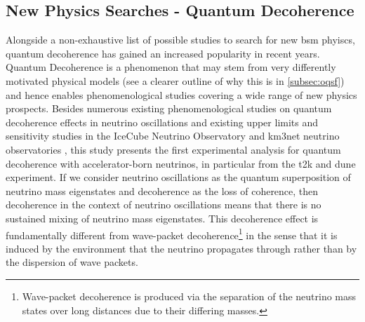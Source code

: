 \subsection{New Physics Searches - Quantum Decoherence}\label{subsec:decoh}
Alongside a non-exhaustive list of possible studies to search for new \acrfull{bsm} phyiscs, quantum decoherence has gained an increased popularity in recent years. Quantum Decoherence is a phenomenon that may stem from very differently motivated physical models (see a clearer outline of why this is in \cref{subsec:oqsf}) and hence enables phenomenological studies covering a wide range of new physics prospects. Besides numerous existing phenomenological studies on quantum decoherence effects in neutrino oscillations \cite{DeRomeri:2023dht,Barenboim:2024wdn,Gomes:2020muc} and existing upper limits and sensitivity studies in the IceCube Neutrino Observatory \cite{IceCube:2021tdn,ICECUBE:2023gdv} and \acrfull{km3net} neutrino observatories \cite{KM3NeT:2024jji}, this study presents the first experimental analysis for quantum decoherence with accelerator-born neutrinos, in particular from the \acrshort{t2k} and \acrshort{dune} experiment. If we consider neutrino oscillations as the quantum superposition of neutrino mass eigenstates and decoherence as the loss of coherence, then decoherence in the context of neutrino oscillations means that there is no sustained mixing of neutrino mass eigenstates. This decoherence effect is fundamentally different from wave-packet decoherence\footnote{Wave-packet decoherence is produced via the separation of the neutrino mass states over long distances due to their differing masses.} in the sense that it is induced by the environment that the neutrino propagates through rather than by the dispersion of wave packets.